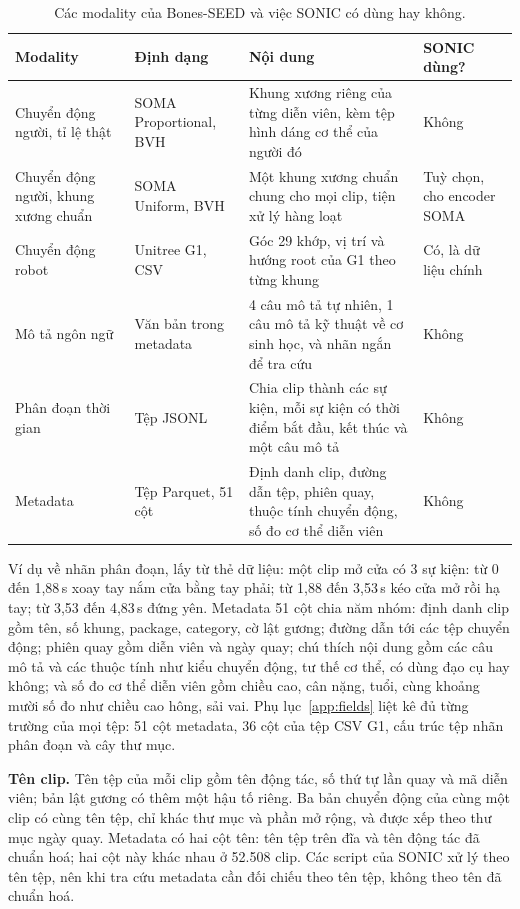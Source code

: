 \documentclass[12pt,a4paper,oneside]{report}
\begin{document}
\begin{table}[htbp]
\centering\footnotesize
\caption[Các modality của Bones-SEED và việc SONIC có dùng hay không]{Các modality của Bones-SEED và việc SONIC có dùng hay không.}
\label{tab:bones_modal}
\begin{tabular}{L{2.6cm}L{3cm}L{5.6cm}L{3.2cm}}
\toprule
\textbf{Modality} & \textbf{Định dạng} & \textbf{Nội dung} & \textbf{SONIC dùng?}\\
\midrule
Chuyển động người, tỉ lệ thật & SOMA Proportional, BVH & Khung xương riêng của từng diễn viên, kèm tệp hình dáng cơ thể của người đó & Không\\
Chuyển động người, khung xương chuẩn & SOMA Uniform, BVH & Một khung xương chuẩn chung cho mọi clip, tiện xử lý hàng loạt & Tuỳ chọn, cho encoder SOMA\\
Chuyển động robot & Unitree G1, CSV & Góc 29 khớp, vị trí và hướng root của G1 theo từng khung & Có, là dữ liệu chính\\
Mô tả ngôn ngữ & Văn bản trong metadata & 4 câu mô tả tự nhiên, 1 câu mô tả kỹ thuật về cơ sinh học, và nhãn ngắn để tra cứu & Không\\
Phân đoạn thời gian & Tệp JSONL & Chia clip thành các sự kiện, mỗi sự kiện có thời điểm bắt đầu, kết thúc và một câu mô tả & Không\\
Metadata & Tệp Parquet, 51 cột & Định danh clip, đường dẫn tệp, phiên quay, thuộc tính chuyển động, số đo cơ thể diễn viên & Không\\
\bottomrule
\end{tabular}
\end{table}

Ví dụ về nhãn phân đoạn, lấy từ thẻ dữ liệu: một clip mở cửa có 3 sự kiện: từ 0 đến 1,88\,s xoay tay nắm cửa bằng tay phải; từ 1,88 đến 3,53\,s kéo cửa mở rồi hạ tay; từ 3,53 đến 4,83\,s đứng yên. Metadata 51 cột chia năm nhóm: định danh clip gồm tên, số khung, package, category, cờ lật gương; đường dẫn tới các tệp chuyển động; phiên quay gồm diễn viên và ngày quay; chú thích nội dung gồm các câu mô tả và các thuộc tính như kiểu chuyển động, tư thế cơ thể, có dùng đạo cụ hay không; và số đo cơ thể diễn viên gồm chiều cao, cân nặng, tuổi, cùng khoảng mười số đo như chiều cao hông, sải vai. Phụ lục~\ref{app:fields} liệt kê đủ từng trường của mọi tệp: 51 cột metadata, 36 cột của tệp CSV G1, cấu trúc tệp nhãn phân đoạn và cây thư mục.

\textbf{Tên clip.} Tên tệp của mỗi clip gồm tên động tác, số thứ tự lần quay và mã diễn viên; bản lật gương có thêm một hậu tố riêng. Ba bản chuyển động của cùng một clip có cùng tên tệp, chỉ khác thư mục và phần mở rộng, và được xếp theo thư mục ngày quay. Metadata có hai cột tên: tên tệp trên đĩa và tên động tác đã chuẩn hoá; hai cột này khác nhau ở 52.508 clip. Các script của SONIC xử lý theo tên tệp, nên khi tra cứu metadata cần đối chiếu theo tên tệp, không theo tên đã chuẩn hoá.
\end{document}

